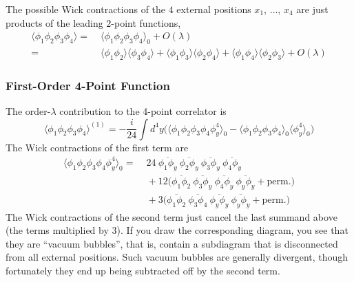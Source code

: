 The possible Wick contractions of the $4$ external positions $x_1$,
$\dots$, $x_4$ are just products of the leading $2$-point functions,
\begin{equation}
  \begin{split}
    \langle \phi_1 \phi_2\phi_3 \phi_4 \rangle 
    =&\;
    \langle \phi_1 \phi_2\phi_3 \phi_4 \rangle_0 + O(\lambda) 
    \\ =&\;
    \langle \phi_1 \phi_2 \rangle
    \langle \phi_3 \phi_4 \rangle +
    \langle \phi_1 \phi_3 \rangle
    \langle \phi_2 \phi_4 \rangle +
    \langle \phi_1 \phi_4 \rangle
    \langle \phi_2 \phi_3 \rangle +
    O(\lambda)
  \end{split}
\end{equation}


\subsubsection{First-Order 4-Point Function}

The order-$\lambda$ contribution to the 4-point correlator is
\begin{equation}
  \langle \phi_1 \phi_2 \phi_3 \phi_4 \rangle^{(1)} = 
  - \frac{i}{24} \int d^4y \Big(
  \langle \phi_1 \phi_2 \phi_3\phi_4 \phi_y^4 \rangle_0 - 
  \langle \phi_1 \phi_2 \phi_3 \phi_4  \rangle_0 
  \langle \phi_y^4 \rangle_0 
  \Big)
\end{equation}
The Wick contractions of the first term are
\begin{equation}
  \begin{split}
    \langle \phi_1 \phi_2 \phi_3 \phi_4 \phi_y^4 \rangle_0 =&\;
    24~
    \overline{\phi_1 \phi_y}~
    \overline{\phi_2 \phi_y}~
    \overline{\phi_3 \phi_y}~
    \overline{\phi_4 \phi_y}
    \\ &\;
    + 12\Big(
    \overline{\phi_1 \phi_2}~
    \overline{\phi_3 \phi_y}~
    \overline{\phi_4 \phi_y}~
    \overline{\phi_y \phi_y}
    + \text{perm.}
    \Big)
    \\ &\;
    + 3\Big(
    \overline{\phi_1 \phi_2}~
    \overline{\phi_3 \phi_4}~
    \overline{\phi_y \phi_y}~
    \overline{\phi_y \phi_y}
    + \text{perm.}
    \Big)
  \end{split}
\end{equation}
The Wick contractions of the second term just cancel the last summand
above (the terms multiplied by $3$). If you draw the corresponding
diagram, you see that they are ``vacuum bubbles'', that is, contain a
subdiagram that is disconnected from all external positions. Such
vacuum bubbles are generally divergent, though fortunately they end up
being subtracted off by the second term. 

